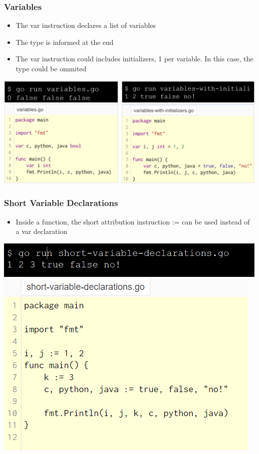 \documentclass[14pt]{beamer}
\begin{document}
{
\begin{frame}
    \frametitle{Variables}
    \begin{itemize}
        \item The var instruction declares a list of variables
        \item The type is informed at the end
        \item The var instruction could includes initializers, 1 per variable. In this case, the type could be ommited
    \end{itemize}
    \begin{center}
        \includegraphics[width=\linewidth]{img/variables.PNG}
    \end{center}
\end{frame}
}

{
\begin{frame}
    \frametitle{Short Variable Declarations}
    \begin{itemize}
        \item Inside a function, the short attribution instruction := can be used instead of a var declaration
    \end{itemize}
    \begin{center}
        \includegraphics[width=0.6\linewidth]{img/shortdeclarationcommand.PNG}
        \includegraphics[width=0.6\linewidth]{img/shortdeclaration.PNG}
    \end{center}
\end{frame}
}
\end{document}
